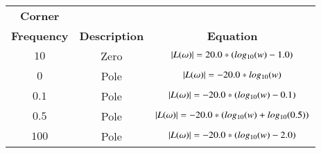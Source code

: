 \begin{tabular}{|c|c|c|}
\hline
     \textbf{Corner}&&\\ \textbf{Frequency} & \textbf{Description} & \textbf{Equation} \\
     \hline
     $10$ &  Zero & $\left\vert L(\omega)\right\vert = 20.0 * (log_{10}(w) - 1.0)$\\
     \hline
     $0$ & Pole & $\left\vert L(\omega)\right\vert = -20.0 * log_{10}(w)$\\
     \hline
     $0.1$ & Pole & $\left\vert L(\omega)\right\vert = -20.0 * (log_{10}(w) - 0.1)$\\
     \hline
     $0.5$ & Pole & $\left\vert L(\omega)\right\vert = -20.0 * (log_{10}(w) + log_{10}(0.5))$\\
     \hline
     $100$ & Pole & $\left\vert L(\omega)\right\vert = -20.0 * (log_{10}(w) - 2.0)$\\
     \hline
\end{tabular}
